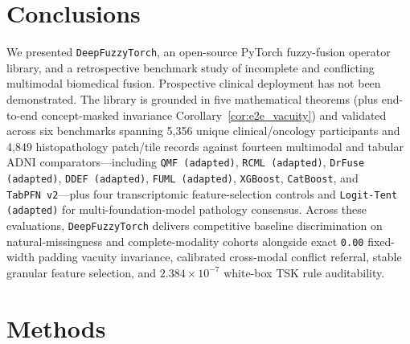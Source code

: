 \documentclass[10pt,twocolumn]{article}
\begin{document}
\section{Conclusions}
\label{sec:conclusion}
We presented \texttt{DeepFuzzyTorch}, an open-source PyTorch fuzzy-fusion operator library,
and a retrospective benchmark study of incomplete and conflicting multimodal biomedical
fusion. Prospective clinical deployment has not been demonstrated. The library is grounded
in five mathematical theorems
(plus end-to-end concept-masked invariance Corollary~\ref{cor:e2e_vacuity}) and validated
across six benchmarks spanning 5,356 unique clinical/oncology participants and 4,849
histopathology patch/tile records against fourteen multimodal and tabular ADNI
comparators---including \texttt{QMF (adapted)}, \texttt{RCML (adapted)},
\texttt{DrFuse (adapted)}, \texttt{DDEF (adapted)}, \texttt{FUML (adapted)},
\texttt{XGBoost}, \texttt{CatBoost}, and \texttt{TabPFN~v2}---plus four transcriptomic
feature-selection controls and \texttt{Logit-Tent (adapted)} for multi-foundation-model
pathology consensus. Across these evaluations,
\texttt{DeepFuzzyTorch} delivers competitive baseline discrimination on natural-missingness
and complete-modality cohorts alongside exact \texttt{0.00} fixed-width padding vacuity
invariance, calibrated cross-modal conflict referral, stable granular feature selection, and
$2.384 \times 10^{-7}$ white-box TSK rule auditability.

\section{Methods}
\label{sec:experiments}
\end{document}
